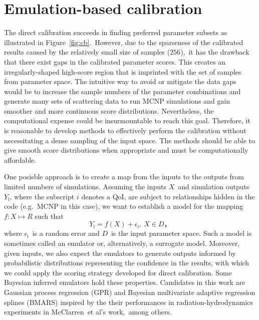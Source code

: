 \documentclass[review]{elsarticle}
\begin{document}
\section{Emulation-based calibration}
The direct calibration succeeds in finding preferred parameter subsets as illustrated in Figure~\ref{fig:cb}.~However, due to the sparseness of the calibrated results caused by the relatively small size of samples ($256$),~it has the drawback that {there exist gaps in the calibrated parameter scores.} This creates an irregularly-shaped high-score region that is imprinted with the set of samples from parameter space.  
The intuitive way to avoid or mitigate the data gaps would be to increase the sample numbers of the parameter combinations and generate many sets of scattering data to run MCNP simulations and gain smoother and more continuous score distributions. Nevertheless, the computational expense could be insurmountable to reach this goal. Therefore, it is reasonable to develop methods to {effectively perform the calibration without necessitating a dense sampling of the input space}. The methods should be able to give smooth score distributions when appropriate and must be computationally affordable.

One posisble approach is to create a map from the inputs to the outputs from limited numbers of simulations. Assuming the inputs $X$~and simulation outputs $Y_\mathrm{i}$, where the subscript $i$ denotes a QoI, are subject to relationships hidden in the code (e.g.~MCNP in this case), we want to establish a  model for the mapping $f:X\mapsto R$ such that
\begin{equation}\label{eq:fitmodel}
Y_\mathrm{i}=f(X)+\epsilon_\mathrm{i},~X\in D，
\end{equation}
where $\epsilon_\mathrm{i}$~is a random error and $D$~is the input parameter space.  Such a model is sometimes called an emulator or, alternatively, a surrogate model.
Moreover, given inputs, we also expect the emulators to generate outputs informed by probabilistic distributions representing the confidence in the results, with which we could apply the scoring strategy developed for direct calibration. Some Bayesian inferred emulators hold these properties. Candidates in this work are Gaussian process regression (GPR) and Bayesian multivariate adaptive regression splines (BMARS) inspired by the their performances in radiation-hydrodynamics experiments in McClarren~et al's work\cite{pie},~among others.
\end{document}
